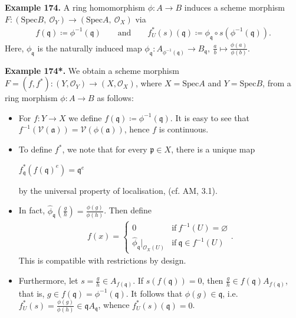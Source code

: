 \documentclass[12pt,a4paper,footinclude=true,headinclude=true]{scrbook} %
\newenvironment{example}[2][Example]
    { \begin{mdframed}[backgroundcolor=gray!20] \textbf{#1 #2.} }
    {  \end{mdframed}}
\begin{document}
\begin{example}{174}
    A ring homomorphism $\phi:A\to B$ induces a scheme morphism\\ $F:(\mathrm{Spec}B,\ \mathcal{O}_Y)\to (\mathrm{Spec}A,\ \mathcal{O}_X)$ via
    \begin{align*}
        f(\mathfrak{q})\coloneqq\phi^{-1}(\mathfrak{q}) \qquad\text{and}\qquad f_U^\ast(s)(\mathfrak{q})\coloneqq\phi_{\mathfrak{q}}\circ s(\phi^{-1} (\mathfrak{q})).
    \end{align*}
    Here, $\phi_{\mathfrak{q}}$ is the naturally induced map $\phi_\mathfrak{q}:A_{\phi^{-1} (\mathfrak{q})}\to B_\mathfrak{q},\ \frac{a}{b}\mapsto\frac{\phi(a)}{\phi(b)}$.
\end{example}

\begin{example}{174*}
    We obtain a scheme morphism $F=(f,f^\ast):(Y,\mathcal{O}_Y)\to(X,\mathcal{O}_X)$, where $X=\mathrm{Spec}A$ and $Y=\mathrm{Spec}B$, from a ring morphism $\phi:A\to B$ as follows:
    \begin{itemize}
        \item For $f:Y\to X$ we define $f(\mathfrak{q})\coloneqq\phi^{-1}(\mathfrak{q})$. It is easy to see that $f^{-1}(\mathcal{V}(\mathfrak{a}))=\mathcal{V}(\phi(\mathfrak{a}))$, hence $f$ is continuous.
        \item To define $f^\ast$, we note that for every $\mathfrak{p}\in X$, there is a unique map
        \begin{center}
            \qquad $f_{\mathfrak{q}}^\ast(f(\mathfrak{q})^e)=\mathfrak{q}^e$
        \end{center}
        by the universal property of localisation, (cf. AM, 3.1). 
        \item In fact, $\hat{\phi}_\mathfrak{q}(\frac{g}{h})= \frac{\phi(g)}{\phi(h)}$. Then define 
        \begin{align*}
            f(x)= \left\{\begin{array}{lc} 0 &\text{if}\ f^{-1}(U)=\varnothing \\ \hat{\phi}_\mathfrak{q}|_{\mathcal{O}_X(U)} &\text{if}\ \mathfrak{q}\in f^{-1}(U) \end{array}\right..
        \end{align*}
        This is compatible with restrictions by design. 
        \item Furthermore, let $s=\frac{g}{h}\in A_{f(\mathfrak{q})}$. If $s(f(\mathfrak{q}))=0$, then $\frac{g}{h}\in f(\mathfrak{q})A_{f(\mathfrak{q})}$, that is, $g\in f(\mathfrak{q})=\phi^{-1}(\mathfrak{q})$. It follows that $\phi(g)\in\mathfrak{q}$, i.e. $f_U^\ast(s)=\frac{\phi(g)}{\phi(h)} \in\mathfrak{q}A_\mathfrak{q}$, whence $f_U^\ast(s)(\mathfrak{q})=0$.
    \end{itemize}
\end{example}
\end{document}
